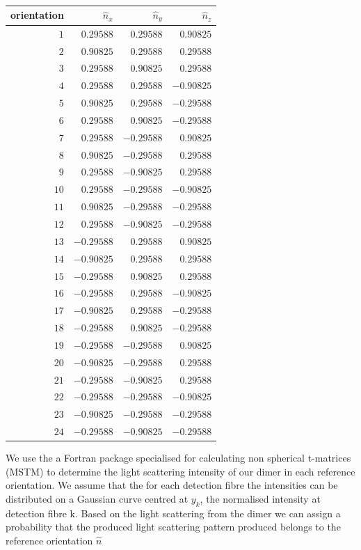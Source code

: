\documentclass[11pt]{article}
\begin{document}
\begin{table}[tb]
\caption{\label{tab:n}}
\begin{tabular}{rrrr}
\hline\hline
orientation & $\hat{n}_x$ &  $\hat{n}_y$ &  $\hat{n}_z$ \\
\hline
$1$ & $ 0.29588$ &  $ 0.29588$ & $ 0.90825$ \\
$2$ & $ 0.90825$ &  $ 0.29588$ & $ 0.29588$ \\
$3$ & $ 0.29588$ &  $ 0.90825$ & $ 0.29588$ \\
$4$ & $ 0.29588$ &  $ 0.29588$ & $-0.90825$ \\
$5$ & $ 0.90825$ &  $ 0.29588$ & $-0.29588$ \\
$6$ & $ 0.29588$ &  $ 0.90825$ & $-0.29588$ \\
$7$ & $ 0.29588$ &  $-0.29588$ & $ 0.90825$ \\
$8$ & $ 0.90825$ &  $-0.29588$ & $ 0.29588$ \\
$9$ & $ 0.29588$ &  $-0.90825$ & $ 0.29588$ \\
$10$ & $ 0.29588$ &  $-0.29588$ & $-0.90825$ \\
$11$ & $ 0.90825$ &  $-0.29588$ & $-0.29588$ \\
$12$ & $ 0.29588$ &  $-0.90825$ & $-0.29588$ \\
$13$ & $-0.29588$ &  $ 0.29588$ & $ 0.90825$ \\
$14$ & $-0.90825$ &  $ 0.29588$ & $ 0.29588$ \\
$15$ & $-0.29588$ &  $ 0.90825$ & $ 0.29588$ \\
$16$ & $-0.29588$ &  $ 0.29588$ & $-0.90825$ \\
$17$ & $-0.90825$ &  $ 0.29588$ & $-0.29588$ \\
$18$ & $-0.29588$ &  $ 0.90825$ & $-0.29588$ \\
$19$ & $-0.29588$ &  $-0.29588$ & $ 0.90825$ \\
$20$ & $-0.90825$ &  $-0.29588$ & $ 0.29588$ \\
$21$ & $-0.29588$ &  $-0.90825$ & $ 0.29588$ \\
$22$ & $-0.29588$ &  $-0.29588$ & $-0.90825$ \\
$23$ & $-0.90825$ &  $-0.29588$ & $-0.29588$ \\
$24$ & $-0.29588$ &  $-0.90825$ & $-0.29588$ \\
\hline\hline
\end{tabular}
\end{table}

We use the a Fortran package specialised for calculating non spherical t-matrices (MSTM) \cite{6} to determine the light scattering intensity of our dimer in each reference orientation. We assume that the for each detection fibre the intensities can be distributed on a Gaussian curve centred at $y_k$, the normalised intensity at detection fibre k. Based on the light scattering from the dimer we can assign a probability that the produced light scattering pattern produced belongs to the reference orientation $\hat{n}$
\end{document}
